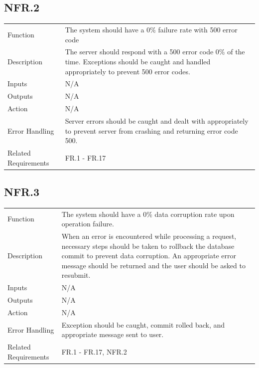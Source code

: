 \documentclass[12pt]{article}
\begin{document}
    \subsection*{NFR.2}
    \begin{center}
        \begin{tabular}{| p{10em} p{26em} |}
        \hline
         Function & The system should have a 0\% failure rate with 500 error code\\
         Description & The server should respond with a 500 error code 0\% of the time. Exceptions should be caught and handled appropriately to prevent 500 error codes. \\
         Inputs & N/A\\
         Outputs & N/A\\
         Action & N/A\\
         Error Handling & Server errors should be caught and dealt with appropriately to prevent server from crashing and returning error code 500.\\
         Related Requirements & FR.1 - FR.17\\
         \hline
        \end{tabular}
    \end{center}
    \subsection*{NFR.3}
    \begin{center}
        \begin{tabular}{| p{10em} p{26em} |}
        \hline
         Function & The system should have a 0\% data corruption rate upon operation failure.\\
         Description & When an error is encountered while processing a request, necessary steps should be taken to rollback the database commit to prevent data corruption. An appropriate error message should be returned and the user should be asked to resubmit.\\
         Inputs & N/A\\
         Outputs & N/A\\
         Action & N/A\\
         Error Handling & Exception should be caught, commit rolled back, and appropriate message sent to user.\\
         Related Requirements & FR.1 - FR.17, NFR.2\\
         \hline
        \end{tabular}
    \end{center}
\end{document}
